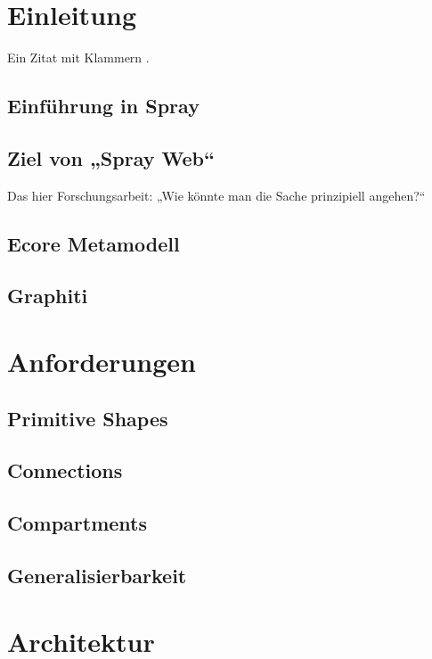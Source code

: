 \section{Einleitung}

Ein Zitat mit Klammern \citep{sprayUser}.

\subsection{Einführung in Spray}

\subsection{Ziel von „Spray Web“}

Das hier Forschungsarbeit: „Wie könnte man die Sache prinzipiell angehen?“

\subsection{Ecore Metamodell}

\subsection{Graphiti}


\section{Anforderungen}

\subsection{Primitive Shapes}

\subsection{Connections}

\subsection{Compartments}

\subsection{Generalisierbarkeit}


\section{Architektur}


